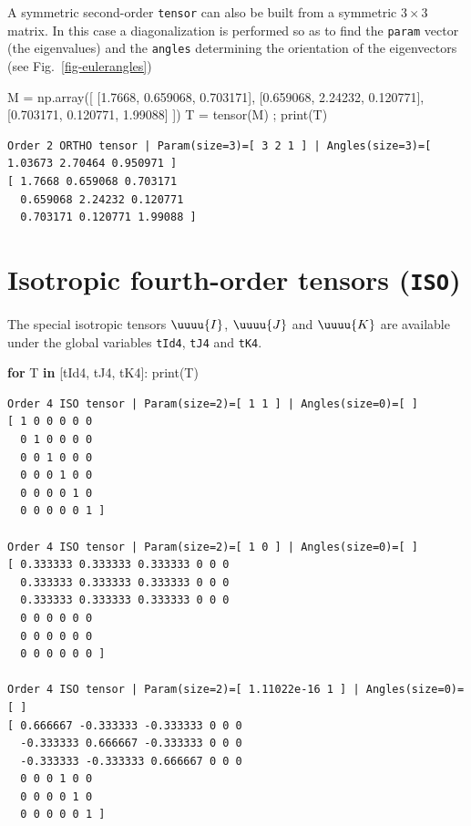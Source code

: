 \documentclass[
  letterpaper,
  DIV=11,
  numbers=noendperiod]{scrreprt}
\newenvironment{Shaded}{\begin{snugshade}}{\end{snugshade}}
\newcommand{\BuiltInTok}[1]{\textcolor[rgb]{0.00,0.23,0.31}{#1}}
\newcommand{\ControlFlowTok}[1]{\textcolor[rgb]{0.00,0.23,0.31}{\textbf{#1}}}
\newcommand{\FloatTok}[1]{\textcolor[rgb]{0.68,0.00,0.00}{#1}}
\newcommand{\KeywordTok}[1]{\textcolor[rgb]{0.00,0.23,0.31}{\textbf{#1}}}
\newcommand{\NormalTok}[1]{\textcolor[rgb]{0.00,0.23,0.31}{#1}}
\newcommand{\OperatorTok}[1]{\textcolor[rgb]{0.37,0.37,0.37}{#1}}
\begin{document}
A symmetric second-order \texttt{tensor} can also be built from a
symmetric \(3×3\) matrix. In this case a diagonalization is performed so
as to find the \texttt{param} vector (the eigenvalues) and the
\texttt{angles} determining the orientation of the eigenvectors (see
Fig.~\ref{fig-eulerangles})

\begin{Shaded}
\begin{Highlighting}[]
\NormalTok{M }\OperatorTok{=}\NormalTok{ np.array([ [}\FloatTok{1.7668}\NormalTok{, }\FloatTok{0.659068}\NormalTok{, }\FloatTok{0.703171}\NormalTok{], }
\NormalTok{               [}\FloatTok{0.659068}\NormalTok{, }\FloatTok{2.24232}\NormalTok{, }\FloatTok{0.120771}\NormalTok{], }
\NormalTok{               [}\FloatTok{0.703171}\NormalTok{, }\FloatTok{0.120771}\NormalTok{, }\FloatTok{1.99088}\NormalTok{] ])}
\NormalTok{T }\OperatorTok{=}\NormalTok{ tensor(M) }\OperatorTok{;} \BuiltInTok{print}\NormalTok{(T)}
\end{Highlighting}
\end{Shaded}

\begin{verbatim}
Order 2 ORTHO tensor | Param(size=3)=[ 3 2 1 ] | Angles(size=3)=[ 1.03673 2.70464 0.950971 ]
[ 1.7668 0.659068 0.703171 
  0.659068 2.24232 0.120771 
  0.703171 0.120771 1.99088 ]
\end{verbatim}

\section{\texorpdfstring{Isotropic fourth-order tensors
(\texttt{ISO})}{Isotropic fourth-order tensors (ISO)}}\label{isotropic-fourth-order-tensors-iso}

The special isotropic tensors \(\uuuu{I}\), \(\uuuu{J}\) and
\(\uuuu{K}\) are available under the global variables \texttt{tId4},
\texttt{tJ4} and \texttt{tK4}.

\begin{Shaded}
\begin{Highlighting}[]
\ControlFlowTok{for}\NormalTok{ T }\KeywordTok{in}\NormalTok{ [tId4, tJ4, tK4]:}
    \BuiltInTok{print}\NormalTok{(T)}
\end{Highlighting}
\end{Shaded}

\begin{verbatim}
Order 4 ISO tensor | Param(size=2)=[ 1 1 ] | Angles(size=0)=[ ]
[ 1 0 0 0 0 0 
  0 1 0 0 0 0 
  0 0 1 0 0 0 
  0 0 0 1 0 0 
  0 0 0 0 1 0 
  0 0 0 0 0 1 ]

Order 4 ISO tensor | Param(size=2)=[ 1 0 ] | Angles(size=0)=[ ]
[ 0.333333 0.333333 0.333333 0 0 0 
  0.333333 0.333333 0.333333 0 0 0 
  0.333333 0.333333 0.333333 0 0 0 
  0 0 0 0 0 0 
  0 0 0 0 0 0 
  0 0 0 0 0 0 ]

Order 4 ISO tensor | Param(size=2)=[ 1.11022e-16 1 ] | Angles(size=0)=[ ]
[ 0.666667 -0.333333 -0.333333 0 0 0 
  -0.333333 0.666667 -0.333333 0 0 0 
  -0.333333 -0.333333 0.666667 0 0 0 
  0 0 0 1 0 0 
  0 0 0 0 1 0 
  0 0 0 0 0 1 ]
\end{verbatim}
\end{document}

